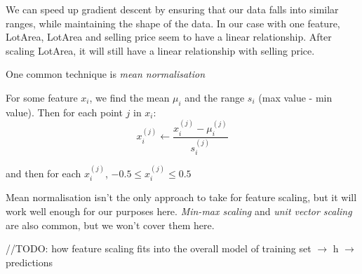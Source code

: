 \documentclass[11pt]{article}
\begin{document}
    We can speed up gradient descent by ensuring that our data falls into similar ranges, while maintaining the shape of the data. In our case with one feature, LotArea, LotArea and selling price seem to have a linear relationship. After scaling LotArea, it will still have a linear relationship with selling price. 

    One common technique is \textit{mean normalisation}

    For some feature $x_i$, we find the mean $\mu_i$ and the range $s_i$ (max value - min value). Then for each point $j$ in $x_i$:
    \[
        x_i^{(j)} \leftarrow \frac{x_i^{(j)} - \mu_i^{(j)}}{s_i^{(j)}}
    \]

    and then for each $x_i^{(j)} $, $-0.5 \leq x_i^{(j)}  \leq 0.5$
    

    
    Mean normalisation isn't the only approach to take for feature scaling, but it will work well enough for our purposes here. \textit{Min-max scaling} and \textit{unit vector scaling} are also common, but we won't cover them here. 
    
    //TODO: how feature scaling fits into the overall model of training set $\rightarrow$ h $\rightarrow $ predictions
\end{document}
